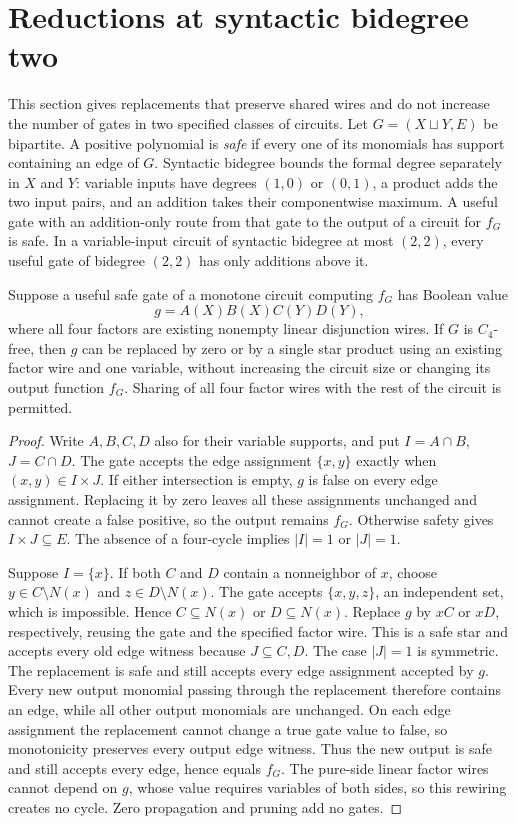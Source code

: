 \section{Reductions at syntactic bidegree two}\label{sec:degree-two}

This section gives replacements that preserve shared wires and do not
increase the number of gates in two specified classes of circuits.
Let $G=(X\sqcup Y,E)$ be bipartite.  A positive polynomial is
\emph{safe} if every one of its monomials has support containing an
edge of $G$. Syntactic bidegree bounds the formal degree separately in
$X$ and $Y$: variable inputs have degrees $(1,0)$ or $(0,1)$, a product
adds the two input pairs, and an addition takes their componentwise
maximum. A useful gate with an addition-only route from that gate
to the output of a circuit for $f_G$ is safe.  In a variable-input
circuit of syntactic bidegree at most $(2,2)$, every useful gate of
bidegree $(2,2)$ has only additions above it.

\begin{lemma}
Suppose a useful safe gate of a monotone circuit computing $f_G$
has Boolean value
\[
 g=A(X)B(X)C(Y)D(Y),
\]
where all four factors are existing nonempty linear disjunction wires.
If $G$ is $C_4$-free, then $g$ can be replaced by zero or by a single
star product using an existing factor wire and one variable, without
increasing the circuit size or changing its output function $f_G$.
Sharing of all four factor wires with the rest of the circuit is
permitted.
\end{lemma}
\begin{proof}
Write $A,B,C,D$ also for their variable supports, and put
$I=A\cap B$, $J=C\cap D$.  The gate accepts the edge assignment
$\{x,y\}$ exactly when $(x,y)\in I\times J$.  If either intersection
is empty, $g$ is false on every edge assignment. Replacing it by zero
leaves all these assignments unchanged and cannot create a false
positive, so the output remains $f_G$.  Otherwise safety gives $I\times J\subseteq E$.
The absence of a four-cycle implies $|I|=1$ or $|J|=1$.

Suppose $I=\{x\}$.  If both $C$ and $D$ contain a nonneighbor of $x$,
choose $y\in C\setminus N(x)$ and $z\in D\setminus N(x)$.
The gate accepts $\{x,y,z\}$, an independent set, which is impossible.
Hence $C\subseteq N(x)$ or $D\subseteq N(x)$.
Replace $g$ by $xC$ or $xD$, respectively, reusing the gate and the
specified factor wire.  This is a safe star and accepts every old
edge witness because $J\subseteq C,D$.  The case $|J|=1$ is symmetric.
The replacement is safe and still accepts every edge assignment
accepted by $g$. Every new output monomial passing through the replacement
therefore contains an edge, while all other output monomials are
unchanged. On each edge assignment the replacement cannot change a true
gate value to false, so monotonicity preserves every output edge witness.
Thus the new output is safe and still accepts every edge, hence equals
$f_G$. The pure-side linear factor wires cannot depend on $g$, whose
value requires variables of both sides, so this rewiring creates no
cycle. Zero propagation and pruning add no gates.
\end{proof}


